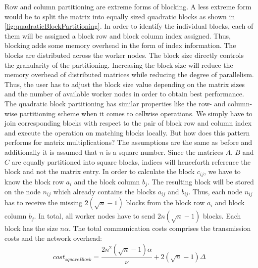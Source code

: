 Row and column partitioning are extreme forms of blocking. A less extreme form would be to split the matrix into equally sized quadratic blocks as shown in \cref{fig:quadraticBlockPartitioning}. In order to identify the individual blocks, each of them will be assigned a block row and block column index assigned. Thus, blocking adds some memory overhead in the form of index information. The blocks are distributed across the worker nodes. The block size directly controls the granularity of the partitioning. Increasing the block size will reduce the memory overhead of distributed matrices while reducing the degree of parallelism. Thus, the user has to adjust the block size value depending on the matrix sizes and the number of available worker nodes in order to obtain best performance. The quadratic block partitioning has similar properties like the row- and column-wise partitioning scheme when it comes to cellwise operations. We simply have to join corresponding blocks with respect to the pair of block row and column index and execute the operation on matching blocks locally. But how does this pattern performs for matrix multiplications? The assumptions are the same as before and additionally it is assumed that $n$ is a square number. Since the matrices $A$, $B$ and $C$ are equally partitioned into square blocks, indices will henceforth reference the block and not the matrix entry. In order to calculate the block $c_{ij}$, we have to know the block row $a_{i}$ and the block column $b_{j}$. The resulting block will be stored on the node $n_{ij}$ which already contains the blocks $a_{ij}$ and $b_{ij}$. Thus, each node $n_{ij}$ has to receive the missing $2\left(\sqrt{n}-1\right)$ blocks from the block row $a_{i}$ and block column $b_{j}$. In total, all worker nodes have to send $2n\left(\sqrt{n}-1\right)$ blocks. Each block has the size $n\alpha$. The total communication costs comprises the transmission costs and the network overhead:
\begin{displaymath}
	cost_{squareBlock} = \frac{2n^2\left(\sqrt{n}-1\right)\alpha}{\nu} + 2\left(\sqrt{n}-1\right)\Delta
\end{displaymath}
